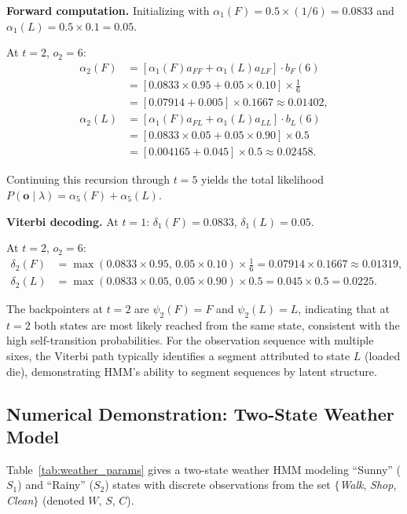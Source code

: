 \documentclass[conference]{IEEEtran}
\begin{document}
\textbf{Forward computation.} Initializing with $\alpha_1(F) = 0.5 \times (1/6) = 0.0833$ and $\alpha_1(L) = 0.5 \times 0.1 = 0.05$.

At $t = 2$, $o_2 = 6$:
\begin{align*}
\alpha_2(F) &= [\alpha_1(F) a_{FF} + \alpha_1(L) a_{LF}] \cdot b_F(6) \\
            &= [0.0833 \times 0.95 + 0.05 \times 0.10] \times \tfrac{1}{6} \\
            &= [0.07914 + 0.005] \times 0.1667 \approx 0.01402, \\
\alpha_2(L) &= [\alpha_1(F) a_{FL} + \alpha_1(L) a_{LL}] \cdot b_L(6) \\
            &= [0.0833 \times 0.05 + 0.05 \times 0.90] \times 0.5 \\
            &= [0.004165 + 0.045] \times 0.5 \approx 0.02458.
\end{align*}

Continuing this recursion through $t = 5$ yields the total likelihood $P(\mathbf{o} \mid \lambda) = \alpha_5(F) + \alpha_5(L)$.

\textbf{Viterbi decoding.} At $t = 1$: $\delta_1(F) = 0.0833$, $\delta_1(L) = 0.05$.

At $t = 2$, $o_2 = 6$:
\begin{align*}
\delta_2(F) &= \max(0.0833 \times 0.95, \, 0.05 \times 0.10) \times \tfrac{1}{6} = 0.07914 \times 0.1667 \approx 0.01319, \\
\delta_2(L) &= \max(0.0833 \times 0.05, \, 0.05 \times 0.90) \times 0.5 = 0.045 \times 0.5 = 0.0225.
\end{align*}

The backpointers at $t=2$ are $\psi_2(F) = F$ and $\psi_2(L) = L$, indicating that at $t=2$ both states are most likely reached from the same state, consistent with the high self-transition probabilities. For the observation sequence with multiple sixes, the Viterbi path typically identifies a segment attributed to state $L$ (loaded die), demonstrating HMM's ability to segment sequences by latent structure.

\subsection{Numerical Demonstration: Two-State Weather Model}

Table~\ref{tab:weather_params} gives a two-state weather HMM modeling ``Sunny'' ($S_1$) and ``Rainy'' ($S_2$) states with discrete observations from the set $\{$\textit{Walk}, \textit{Shop}, \textit{Clean}$\}$ (denoted $W$, $S$, $C$).
\end{document}
